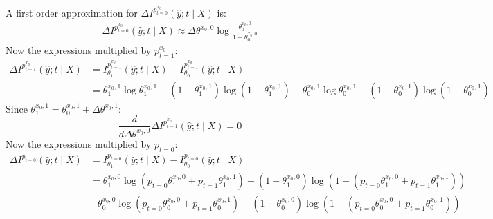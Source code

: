 \documentclass[oneside,12pt]{article}
\begin{document}
%
A first order approximation for $\Delta I^{p^{x_0}_{t=0}}(\hat{y};t \mid X)$ is:
\begin{equation*}
    \begin{split}
        \Delta I^{p^{x_0}_{t=0}}(\hat{y};t \mid X) \approx \Delta\theta^{x_0,0} \operatorname{log}\frac{\theta_0^{x_0,0}}{1-\theta_0^{x_0,0}}
    \end{split}
\end{equation*}
%
Now the expressions multiplied by $p^{x_0}_{t=1}$:
\begin{equation*}
    \begin{split}
        \Delta I^{p^{x_0}_{t=1}}(\hat{y};t \mid X) &= I^{p^{x_0}_{t=1}}_{\theta_1}(\hat{y};t \mid X) - I^{p^{x_0}_{t=1}}_{\theta_0}(\hat{y};t \mid X)\\
        &= \theta_1^{x_0,1}\operatorname{log}\theta_1^{x_0,1} + (1-\theta_1^{x_0,1})\operatorname{log}(1-\theta_1^{x_0,1}) - \theta_0^{x_0,1}\operatorname{log}\theta_0^{x_0,1} - (1-\theta_0^{x_0,1})\operatorname{log}(1-\theta_0^{x_0,1})
    \end{split}
\end{equation*}
%
Since $\theta_1^{x_0,1} = \theta_0^{x_0,1} + \Delta\theta^{x_0,1}$:
\begin{equation*}
    \frac{d}{d\Delta\theta^{x_0,0}}\Delta I^{p^{x_0}_{t=1}}(\hat{y};t \mid X) = 0
\end{equation*}
%
Now the expressions multiplied by $p_{t=0}$:
%
\begin{equation*}
    \begin{split}
        \Delta I^{p_{t=0}}(\hat{y};t \mid X) &= I^{p_{t=0}}_{\theta_1}(\hat{y};t \mid X) - I^{p_{t=0}}_{\theta_0}(\hat{y};t \mid X)\\
        &= \theta_1^{x_0,0}\operatorname{log}(p_{t=0}\theta_1^{x_0,0}+p_{t=1}\theta_1^{x_0,1})+
        (1-\theta_1^{x_0,0})\operatorname{log}(1 - (p_{t=0}\theta_1^{x_0,0}+p_{t=1}\theta_1^{x_0,1}))\\ 
        &-\theta_0^{x_0,0}\operatorname{log}(p_{t=0}\theta_0^{x_0,0}+p_{t=1}\theta_0^{x_0,1})-
        (1-\theta_0^{x_0,0})\operatorname{log}(1 - (p_{t=0}\theta_0^{x_0,0}+p_{t=1}\theta_0^{x_0,1}))
    \end{split}
\end{equation*}
%
\end{document}
